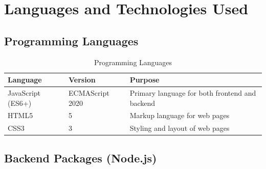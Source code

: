 \documentclass[12pt,a4paper]{article}
\begin{document}
\newpage
\section{Languages and Technologies Used}

\subsection{Programming Languages}

\begin{table}[h!]
\centering
\begin{tabular}{@{}lll@{}}
\toprule
\textbf{Language} & \textbf{Version} & \textbf{Purpose} \\
\midrule
JavaScript (ES6+) & ECMAScript 2020 & Primary language for both frontend and backend \\
HTML5 & 5 & Markup language for web pages \\
CSS3 & 3 & Styling and layout of web pages \\
\bottomrule
\end{tabular}
\caption{Programming Languages}
\end{table}

\subsection{Backend Packages (Node.js)}
\end{document}
